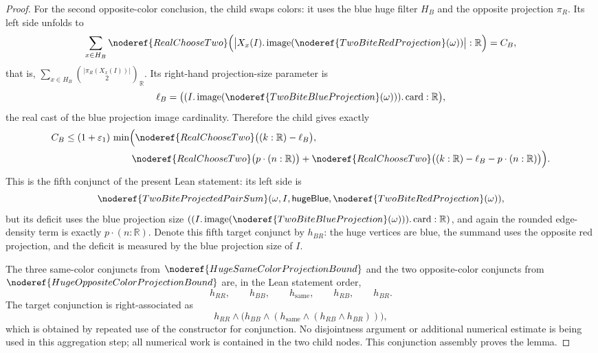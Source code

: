 \begin{proof}
For the second opposite-color conclusion, the child swaps colors: it uses the
blue huge filter \(H_B\) and the opposite projection \(\pi_R\).  Its left side
unfolds to
\[
\sum_{x\in H_B}\noderef{RealChooseTwo}
  \Bigl(\bigl|X_x(I).\operatorname{image}
    (\noderef{TwoBiteRedProjection}(\omega))\bigr|:\mathbb R\Bigr)=C_B,
\]
that is, \(\sum_{x\in H_B}\binom{|\pi_R(X_x(I))|}{2}_{\mathbb R}\).  Its
right-hand projection-size parameter is
\[
\ell_B=\bigl((I.\operatorname{image}
  (\noderef{TwoBiteBlueProjection}(\omega))).\operatorname{card}:\mathbb R\bigr),
\]
the real cast of the blue projection image cardinality.  Therefore the child
gives exactly
\[
\begin{aligned}
C_B
&\le
(1+\varepsilon_1)\,
\min\Bigl(
  \noderef{RealChooseTwo}\bigl((k:\mathbb R)-\ell_B\bigr),\\
&\hspace{7em}
  \noderef{RealChooseTwo}\bigl(p\cdot(n:\mathbb R)\bigr)
  +\noderef{RealChooseTwo}
    \bigl((k:\mathbb R)-\ell_B-p\cdot(n:\mathbb R)\bigr)
\Bigr).
\end{aligned}
\]
This is the fifth conjunct of the present Lean statement: its left side is
\[
\noderef{TwoBiteProjectedPairSum}
  (\omega,I,\mathsf{hugeBlue},\noderef{TwoBiteRedProjection}(\omega)),
\]
but its deficit uses the blue projection size
\(((I.\operatorname{image}(\noderef{TwoBiteBlueProjection}(\omega))).\operatorname{card}:\mathbb R)\),
and again the rounded edge-density term is exactly \(p\cdot(n:\mathbb R)\).
Denote this fifth target conjunct by \(h_{BR}\): the huge vertices are blue,
the summand uses the opposite red projection, and the deficit is measured by
the blue projection size of \(I\).

The three same-color conjuncts from
\(\noderef{HugeSameColorProjectionBound}\) and the two opposite-color
conjuncts from \(\noderef{HugeOppositeColorProjectionBound}\) are, in the
Lean statement order,
\[
h_{RR},\qquad h_{BB},\qquad h_{\mathrm{same}},\qquad h_{RB},\qquad h_{BR}.
\]
The target conjunction is right-associated as
\[
h_{RR}\wedge
  \bigl(h_{BB}\wedge
    (h_{\mathrm{same}}\wedge(h_{RB}\wedge h_{BR}))\bigr),
\]
which is obtained by repeated use of the constructor for conjunction.  No
disjointness argument or additional numerical estimate is being used in this
aggregation step; all numerical work is contained in the two child nodes.
This conjunction assembly proves the lemma.
\end{proof}
